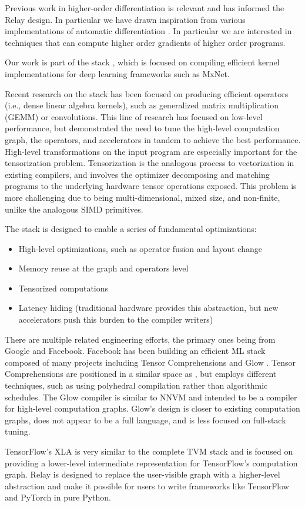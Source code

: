 Previous work in higher-order differentiation is relevant and has informed
the Relay design. In particular we have drawn inspiration from
various implementations of automatic differentiation \cite{beautiful_diff, ad_survey, haskell_ad, toplas_reverse, wang_reverse, DLS, DDF}.
In particular we are interested in techniques that can compute higher order gradients of higher order programs.

Our work is part of the \tvm stack \cite{TVMSysML}, which is focused on compiling efficient
kernel implementations for deep learning frameworks such as MxNet.

Recent research on the \tvm stack \cite{TVMSysML} has been focused on producing efficient
operators (i.e., dense linear algebra kernels), such as generalized matrix multiplication (GEMM) or
convolutions. This line of research has focused on low-level performance, but demonstrated the need to
tune the high-level computation graph, the operators, and accelerators in tandem to achieve the best performance.
High-level transformations on the input program are especially important for the tensorization problem.
Tensorization is the analogous process to vectorization in existing compilers, and involves the optimizer
decomposing and matching programs to the underlying hardware tensor operations exposed.
This problem is more challenging due to being multi-dimensional, mixed size, and non-finite,
unlike the analogous SIMD primitives.

The \tvm stack is designed to enable a series of fundamental optimizations:

\begin{itemize}
    \item High-level optimizations, such as operator fusion and layout change
    \item Memory reuse at the graph and operators level
    \item Tensorized computations
    \item Latency hiding (traditional hardware provides this abstraction,
          but new accelerators push this burden to the compiler writers)
\end{itemize}

There are multiple related engineering efforts, the primary ones being from Google and Facebook.
Facebook has been building an efficient ML stack composed of many projects
including Tensor Comprehensions \cite{tensor_comprehensions} and Glow \cite{glow}.
Tensor Comprehensions are positioned in a similar space as \tvm, but employs
different techniques, such as using polyhedral compilation rather than algorithmic schedules.
The Glow compiler \cite{glow} is similar to NNVM and intended to
be a compiler for high-level computation graphs. Glow's design is closer to existing
computation graphs, does not appear to be a full language, and is less focused
on full-stack tuning.

TensorFlow's XLA is very similar to the complete TVM stack and is focused on providing
a lower-level intermediate representation for TensorFlow's computation graph. Relay is
designed to replace the user-visible graph with a higher-level abstraction and make it
possible for users to write frameworks like TensorFlow and PyTorch in pure Python.
